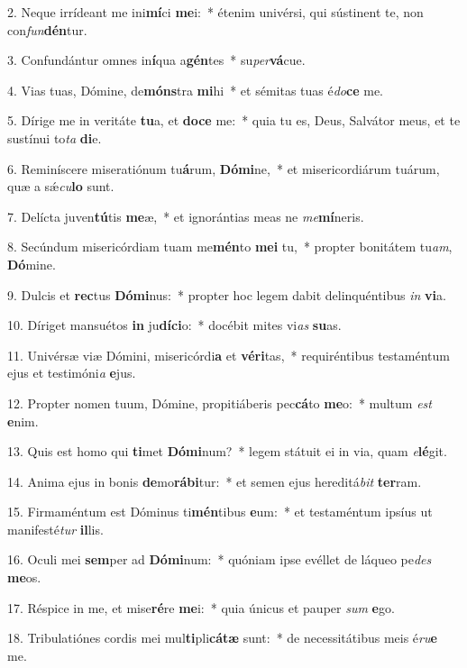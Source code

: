 2. Neque irrídeant me ini\textbf{mí}ci \textbf{me}i:~*  étenim univérsi, qui sústinent te, non con\textit{fun}\textbf{dén}tur.\

3. Confundántur omnes in\textbf{í}qua a\textbf{gén}tes~*  su\textit{per}\textbf{vá}cue.\

4. Vias tuas, Dómine, de\textbf{móns}tra \textbf{mi}hi~*  et sémitas tuas é\textit{do}\textbf{ce} me.\

5. Dírige me in veritáte \textbf{tu}a, et \textbf{do}\textbf{ce} me:~*  quia tu es, Deus, Salvátor meus, et te sustínui to\textit{ta} \textbf{di}e.\

6. Reminíscere miseratiónum tu\textbf{á}rum, \textbf{Dó}\textbf{mi}ne,~*  et misericordiárum tuárum, quæ a sǽ\textit{cu}\textbf{lo} sunt.\

7. Delícta juven\textbf{tú}tis \textbf{me}æ,~*  et ignorántias meas ne \textit{me}\textbf{mí}neris.\

8. Secúndum misericórdiam tuam me\textbf{mén}to \textbf{me}\textbf{i} tu,~*  propter bonitátem tu\textit{am}, \textbf{Dó}mine.\

9. Dulcis et \textbf{rec}tus \textbf{Dó}\textbf{mi}nus:~*  propter hoc legem dabit delinquéntibus \textit{in} \textbf{vi}a.\

10. Díriget mansuétos \textbf{in} ju\textbf{dí}\textbf{ci}o:~*  docébit mites vi\textit{as} \textbf{su}as.\

11. Univérsæ viæ Dómini, misericórdi\textbf{a} et \textbf{vé}\textbf{ri}tas,~*  requiréntibus testaméntum ejus et testimóni\textit{a} \textbf{e}jus.\

12. Propter nomen tuum, Dómine, propitiáberis pec\textbf{cá}to \textbf{me}o:~*  multum \textit{est} \textbf{e}nim.\

13. Quis est homo qui \textbf{ti}met \textbf{Dó}\textbf{mi}num?~*  legem státuit ei in via, quam \textit{e}\textbf{lé}git.\

14. Anima ejus in bonis \textbf{de}mo\textbf{rá}\textbf{bi}tur:~*  et semen ejus hereditá\textit{bit} \textbf{ter}ram.\

15. Firmaméntum est Dóminus ti\textbf{mén}tibus \textbf{e}um:~*  et testaméntum ipsíus ut manifesté\textit{tur} \textbf{il}lis.\

16. Oculi mei \textbf{sem}per ad \textbf{Dó}\textbf{mi}num:~*  quóniam ipse evéllet de láqueo pe\textit{des} \textbf{me}os.\

17. Réspice in me, et mise\textbf{ré}re \textbf{me}i:~*  quia únicus et pauper \textit{sum} \textbf{e}go.\

18. Tribulatiónes cordis mei mul\textbf{ti}pli\textbf{cá}\textbf{tæ} sunt:~*  de necessitátibus meis é\textit{ru}\textbf{e} me.\

